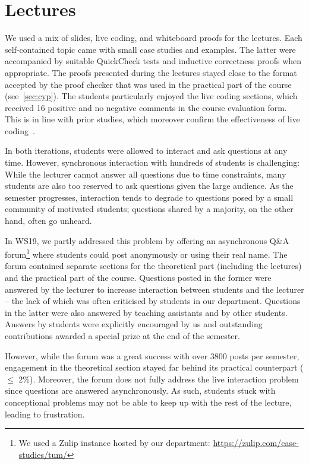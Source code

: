 \section{Lectures}\label{sec:lectures}

We used a mix of
slides,
live coding, and whiteboard proofs for the lectures.
Each self-contained topic came with small case studies and examples.
The latter were accompanied by suitable QuickCheck tests
and inductive correctness proofs when appropriate.
The proofs presented during the lectures stayed close to the format accepted by the proof checker that was used in the practical part of the course (see~\cref{sec:cyp}).
The students particularly enjoyed the live coding sections,
which received 16 positive and no negative comments in the course evaluation form.
This is in line with prior studies,
which moreover confirm the effectiveness of live coding~\cite{livecoding1,livecoding2}.

In both iterations, students were allowed to interact and ask questions at any time.
However, synchronous interaction with hundreds of students is challenging:
While the lecturer cannot answer all questions due to time constraints,
many students are also too reserved to ask questions given the large audience.
As the semester progresses, interaction tends to degrade to
questions posed by a small community of motivated students;
questions shared by a majority, on the other hand, often go unheard.

In WS19, we partly addressed this problem by offering an asynchronous Q\&A forum\footnote{We used a Zulip instance hosted by our department: \url{https://zulip.com/case-studies/tum/}}
where students could post anonymously or using their real name.
The forum contained separate sections for the theoretical part (including the lectures)
and the practical part of the course.
Questions posted in the former were answered by the lecturer
to increase interaction between students and the lecturer -- the lack of which was often criticised by students in our department.
Questions in the latter were also answered by teaching assistants and by other students.
Answers by students were explicitly encouraged by us and
outstanding contributions awarded a special prize at the end of the semester.

However, while the forum was a great success with over 3800 posts per semester,
engagement in the theoretical section stayed far behind its practical counterpart ($\leq$ 2\%).
Moreover, the forum does not fully address the live interaction problem since
questions are answered asynchronously.
As such, students stuck with conceptional problems may not be able
to keep up with the rest of the lecture,
leading to frustration.


